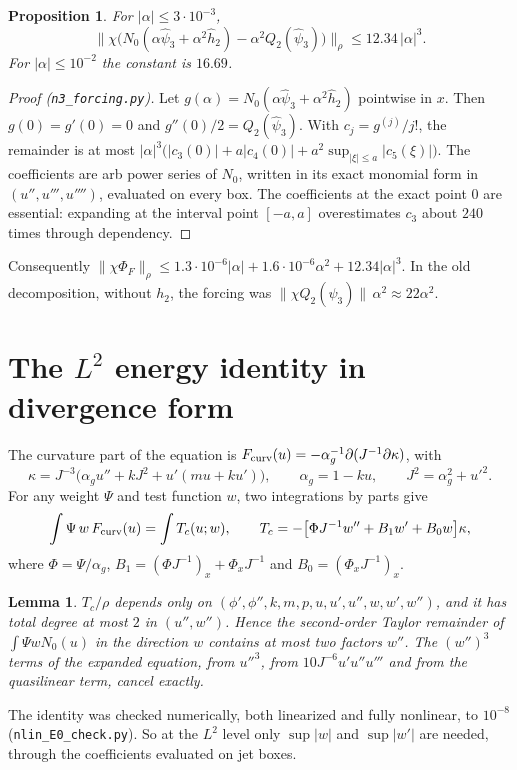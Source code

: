 \documentclass[11pt]{amsart}
\newtheorem{proposition}[theorem]{Proposition}
\newtheorem{lemma}[theorem]{Lemma}
\theoremstyle{remark}
\begin{document}
\begin{proposition}\label{prop:n3}
For $|\alpha|\le3\cdot10^{-3}$,
\[
\big\|\chi\big(N_0(\alpha\hat\psi_3+\alpha^2\hat h_2)-\alpha^2Q_2(\hat\psi_3)\big)\big\|_\rho\le12.34\,|\alpha|^3 .
\]
For $|\alpha|\le10^{-2}$ the constant is $16.69$.
\end{proposition}
\begin{proof}[Proof (\texttt{n3\_forcing.py})]
Let $g(\alpha)=N_0(\alpha\hat\psi_3+\alpha^2\hat h_2)$ pointwise in $x$. Then $g(0)=g'(0)=0$ and $g''(0)/2=Q_2(\hat\psi_3)$. With $c_j=g^{(j)}/j!$, the remainder is at most $|\alpha|^3\big(|c_3(0)|+a|c_4(0)|+a^2\sup_{|\xi|\le a}|c_5(\xi)|\big)$. The coefficients are arb power series of $N_0$, written in its exact monomial form in $(u'',u''',u'''')$, evaluated on every box. The coefficients at the exact point $0$ are essential: expanding at the interval point $[-a,a]$ overestimates $c_3$ about $240$ times through dependency.
\end{proof}

Consequently $\|\chi\Phi_F\|_\rho\le1.3\cdot10^{-6}|\alpha|+1.6\cdot10^{-6}\alpha^2+12.34|\alpha|^3$. In the old decomposition, without $h_2$, the forcing was $\|\chi Q_2(\hat\psi_3)\|\,\alpha^2\approx22\alpha^2$.

\section{The $L^2$ energy identity in divergence form}
The curvature part of the equation is $F_{\rm curv}(u)=-\alpha_g^{-1}\partial(J^{-1}\partial\kappa)$, with
\[
\kappa=J^{-3}\big(\alpha_gu''+kJ^2+u'(mu+ku')\big),\qquad \alpha_g=1-ku,\qquad J^2=\alpha_g^2+u'^2 .
\]
For any weight $\Psi$ and test function $w$, two integrations by parts give
\[
\int\Psi\,w\,F_{\rm curv}(u)=\int T_c(u;w),\qquad T_c=-\big[\Phi J^{-1}w''+B_1w'+B_0w\big]\kappa,
\]
where $\Phi=\Psi/\alpha_g$, $B_1=(\Phi J^{-1})_x+\Phi_xJ^{-1}$ and $B_0=(\Phi_xJ^{-1})_x$.

\begin{lemma}
$T_c/\rho$ depends only on $(\phi',\phi'',k,m,p,u,u',u'',w,w',w'')$, and it has total degree at most $2$ in $(u'',w'')$. Hence the second-order Taylor remainder of $\int\Psi wN_0(u)$ in the direction $w$ contains at most two factors $w''$. The $(w'')^3$ terms of the expanded equation, from $u''^3$, from $10J^{-6}u'u''u'''$ and from the quasilinear term, cancel exactly.
\end{lemma}
The identity was checked numerically, both linearized and fully nonlinear, to $10^{-8}$ (\texttt{nlin\_E0\_\allowbreak check.py}). So at the $L^2$ level only $\sup|w|$ and $\sup|w'|$ are needed, through the coefficients evaluated on jet boxes.
\end{document}
